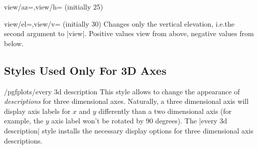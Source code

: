 {\begin{pgfplotskeylist}{view/az=,view/h= (initially 25)}
\pgfplotsexpensiveexample
\begin{codeexample}[]
\end{codeexample}

\pgfplotsexpensiveexample
\begin{codeexample}[]
\end{codeexample}
\end{pgfplotskeylist}

\begin{pgfplotskeylist}{view/el=,view/v= (initially 30)}
    Changes only the vertical elevation, i.e.\@ the second argument to |view|.
    Positive values view from above, negative values from below.
\end{pgfplotskeylist}


\subsection{Styles Used Only For 3D Axes}

\begin{stylekey}{/pgfplots/every 3d description}
    This style allows to change the appearance of \emph{descriptions} for three
    dimensional axes. Naturally, a three dimensional axis will display axis
    labels for $x$ and $y$ differently  than a two dimensional axis (for
    example, the $y$ axis label won't be rotated by 90 degrees). The
    |every 3d description| style installs the necessary display options for
    three dimensional axis descriptions.


\end{stylekey}}
